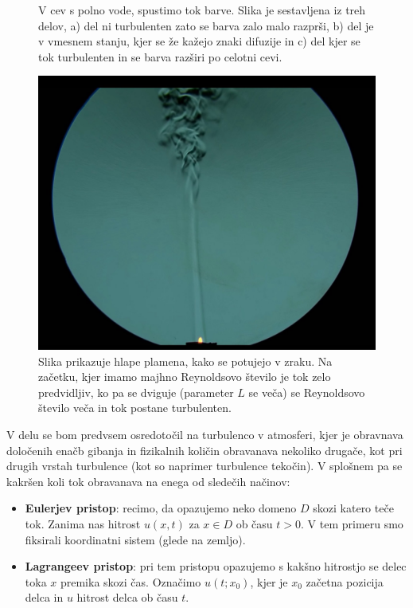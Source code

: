\documentclass[mat2, tisk]{fmfdelo}
\begin{document}
\begin{itemize}
\begin{figure}[h!]
\caption{V cev s polno vode, spustimo tok barve. Slika je sestavljena iz treh delov, a) del ni turbulenten zato se barva zalo malo razprši,
b) del je v vmesnem stanju, kjer se že kažejo znaki difuzije in c) del kjer se tok turbulenten in se barva razširi po celotni cevi.}
\label{fig:difus}
\end{figure}
\begin{figure}[h]
  \centering
\includegraphics[scale=0.19]{slike/Reynolds.jpeg}
\caption{Slika prikazuje hlape plamena, kako se potujejo v zraku. Na začetku, kjer imamo majhno Reynoldsovo število je tok zelo predvidljiv,
ko pa se dviguje (parameter $L$ se veča) se Reynoldsovo število veča in tok postane turbulenten.}
\end{figure}
\end{itemize}

V delu se bom predvsem osredotočil na turbulenco v atmosferi, kjer je obravnava določenih enačb
gibanja in fizikalnih količin obravanava nekoliko drugače, kot pri drugih vrstah turbulence (kot so naprimer turbulence tekočin).
V splošnem pa se kakršen koli tok obravanava na enega od sledečih načinov:
\begin{itemize}
  \item \textbf{Eulerjev pristop}: recimo, da opazujemo neko domeno $D$ skozi katero teče tok.
  Zanima nas hitrost $u(x, t)$ za $x \in D$ ob času $t > 0$. V tem primeru smo fiksirali koordinatni
  sistem (glede na zemljo).
  \item \textbf{Lagrangeev pristop}: pri tem pristopu opazujemo s kakšno hitrostjo se delec toka 
  $x$ premika skozi čas. Označimo $u(t; x_0)$, kjer je $x_0$ začetna pozicija delca in 
  $u$ hitrost delca ob času $t$. 
\end{itemize}
\end{document}
